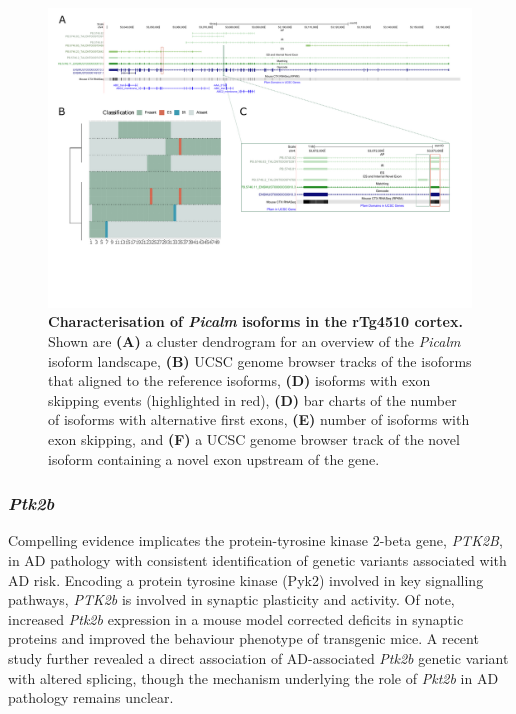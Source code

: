 \begin{landscape}
	\begin{figure}[htp]
		\centering
		\captionsetup{width=1.3\textwidth}
		\includegraphics[page=8,trim={0 1cm 0 0},scale = 0.8]{Figures/TargetGenes_Annotation_Landscape.pdf}
		\caption[Characterisation of the \textit{Picalm} isoform landscape]%
		{\textbf{Characterisation of \textit{Picalm} isoforms in the rTg4510 cortex.} Shown are \textbf{(A)} a cluster dendrogram for an overview of the \textit{Picalm} isoform landscape, \textbf{(B)} UCSC genome browser tracks of the isoforms that aligned to the reference isoforms, \textbf{(D)} isoforms with exon skipping events (highlighted in red), \textbf{(D)} bar charts of the number of isoforms with alternative first exons, \textbf{(E)} number of isoforms with exon skipping, and \textbf{(F)} a UCSC genome browser track of the novel isoform containing a novel exon upstream of the gene.}    
		\label{fig:picalm}
	\end{figure}
\end{landscape}
\restoregeometry

\newpage
\subsubsection{\textit{Ptk2b}}
Compelling evidence implicates the protein-tyrosine kinase 2-beta gene, \textit{PTK2B}, in AD pathology with consistent identification of genetic variants associated with AD risk\cite{Lambert2013,Kunkle2019}. Encoding a protein tyrosine kinase (Pyk2) involved in key signalling pathways, \textit{PTK2b} is involved in synaptic plasticity and activity. Of note, increased \textit{Ptk2b} expression in a mouse model corrected deficits in synaptic proteins and improved the behaviour phenotype of transgenic mice\cite{Giralt2018}. A recent study further revealed a direct association of AD-associated \textit{Ptk2b} genetic variant with altered splicing\cite{Raj2018}, though the mechanism underlying the role of \textit{Pkt2b} in AD pathology remains unclear.

